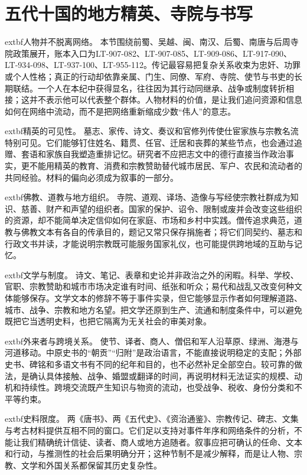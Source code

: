 \section{五代十国的地方精英、寺院与书写}
\label{sec:regional-elites-religion-writing}

\noindent	extbf{人物并不脱离网络。} 本节围绕前蜀、吴越、闽、南汉、后蜀、南唐与后周寺院政策展开，账本入口为LT-907-082、LT-907-085、LT-909-086、LT-917-090、LT-934-098、LT-937-100、LT-955-112。传记最容易把复杂关系收束为忠奸、功罪或个人性格；真正的行动却依靠亲属、门生、同僚、军府、寺院、使节与书吏的长期联结。一个人在本纪中获得显名，往往因为其行动同继承、战争或制度转折相接；这并不表示他可以代表整个群体。人物材料的价值，是让我们追问资源和信息如何在网络中流动，而不是把网络重新缩成少数“伟人”的意志。

\noindent	extbf{精英的可见性。} 墓志、家传、诗文、奏议和官修列传使仕宦家族与宗教名流特别可见。它们能够钉住姓名、籍贯、任官、迁居和丧葬的某些节点，也会通过追赠、套语和家族自我塑造重排记忆。研究者不应把志文中的德行直接当作政治事实，更不能用精英的教育、消费和宗教赞助替代城市居民、军户、农民和流动者的共同经验。材料的偏向必须成为叙事的一部分。

\noindent	extbf{佛教、道教与地方组织。} 寺院、道观、译场、造像与写经使宗教社群成为知识、慈善、财产和声望的组织者。国家的保护、诏令、限制或废并会改变这些组织的资源，却不能简单决定信仰如何在家庭、市场和乡村中实践。僧传追求典范，道教与佛教文本有各自的传承目的，题记又常只保存捐施者；将它们同契约、墓志和行政文书并读，才能说明宗教既可能服务国家礼仪，也可能提供跨地域的互助与记忆。

\noindent	extbf{文学与制度。} 诗文、笔记、表章和史论并非政治之外的闲暇。科举、学校、官职、宗教赞助和城市市场决定谁有时间、纸张和听众；易代和战乱又改变何种文体能够保存。文学文本的修辞不等于事件实录，但它能够显示作者如何理解道路、城市、战争、宗教和地方名望。把文学还原到生产、流通和制度条件中，可以避免既把它当透明史料，也把它隔离为无关社会的审美对象。

\noindent	extbf{外来者与跨境关系。} 使节、译者、商人、僧侣和军人沿草原、绿洲、海港与河道移动。中原史书的“朝贡”“归附”是政治语言，不能直接说明稳定的支配；外部史书、碑铭和多语文书有不同的纪年和目的，也不必然补足全部空白。较可靠的做法，是确认具体接触、战争、婚盟或翻译的时间，再说明材料无法证实的规模、动机和持续性。跨境交流既产生知识与物资的流动，也受战争、税收、身份分类和不平等约束。

\noindent	extbf{史料限度。} 两《唐书》、两《五代史》、《资治通鉴》、宗教传记、碑志、文集与考古材料提供互相不同的窗口。它们足以支持对事件年序和网络条件的分析，不能让我们精确统计信徒、读者、商人或地方追随者。叙事应把可确认的任命、文本和行动，与推测性的社会后果明确分开；这种节制不是减少解释，而是让人物、宗教、文学和外国关系都保留其历史复杂性。

